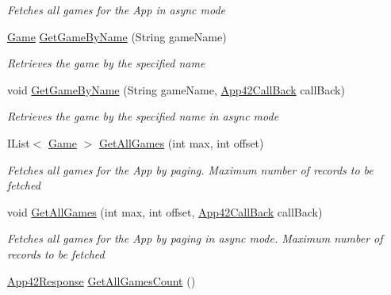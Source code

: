 \begin{DoxyCompactItemize}
\begin{DoxyCompactList}\small\item\em Fetches all games for the App in async mode \end{DoxyCompactList}\item 
\hyperlink{classcom_1_1shephertz_1_1app42_1_1paas_1_1sdk_1_1csharp_1_1game_1_1_game}{Game} \hyperlink{classcom_1_1shephertz_1_1app42_1_1paas_1_1sdk_1_1csharp_1_1game_1_1_game_service_acab68c837376352edeac14ea8429300d}{Get\+Game\+By\+Name} (String game\+Name)
\begin{DoxyCompactList}\small\item\em Retrieves the game by the specified name \end{DoxyCompactList}\item 
void \hyperlink{classcom_1_1shephertz_1_1app42_1_1paas_1_1sdk_1_1csharp_1_1game_1_1_game_service_ae3f57c12124d11e424f324d2f97c7584}{Get\+Game\+By\+Name} (String game\+Name, \hyperlink{interfacecom_1_1shephertz_1_1app42_1_1paas_1_1sdk_1_1csharp_1_1_app42_call_back}{App42\+Call\+Back} call\+Back)
\begin{DoxyCompactList}\small\item\em Retrieves the game by the specified name in async mode \end{DoxyCompactList}\item 
I\+List$<$ \hyperlink{classcom_1_1shephertz_1_1app42_1_1paas_1_1sdk_1_1csharp_1_1game_1_1_game}{Game} $>$ \hyperlink{classcom_1_1shephertz_1_1app42_1_1paas_1_1sdk_1_1csharp_1_1game_1_1_game_service_a130fd862e073c6e1c1a190c14450e31c}{Get\+All\+Games} (int max, int offset)
\begin{DoxyCompactList}\small\item\em Fetches all games for the App by paging. Maximum number of records to be fetched \end{DoxyCompactList}\item 
void \hyperlink{classcom_1_1shephertz_1_1app42_1_1paas_1_1sdk_1_1csharp_1_1game_1_1_game_service_ac52fb41f1a1ecfe8fb93e11387a366ad}{Get\+All\+Games} (int max, int offset, \hyperlink{interfacecom_1_1shephertz_1_1app42_1_1paas_1_1sdk_1_1csharp_1_1_app42_call_back}{App42\+Call\+Back} call\+Back)
\begin{DoxyCompactList}\small\item\em Fetches all games for the App by paging in async mode. Maximum number of records to be fetched \end{DoxyCompactList}\item 
\hyperlink{classcom_1_1shephertz_1_1app42_1_1paas_1_1sdk_1_1csharp_1_1_app42_response}{App42\+Response} \hyperlink{classcom_1_1shephertz_1_1app42_1_1paas_1_1sdk_1_1csharp_1_1game_1_1_game_service_a6bae897478276fa447ca7bfd05511e28}{Get\+All\+Games\+Count} ()

\end{DoxyCompactItemize}
